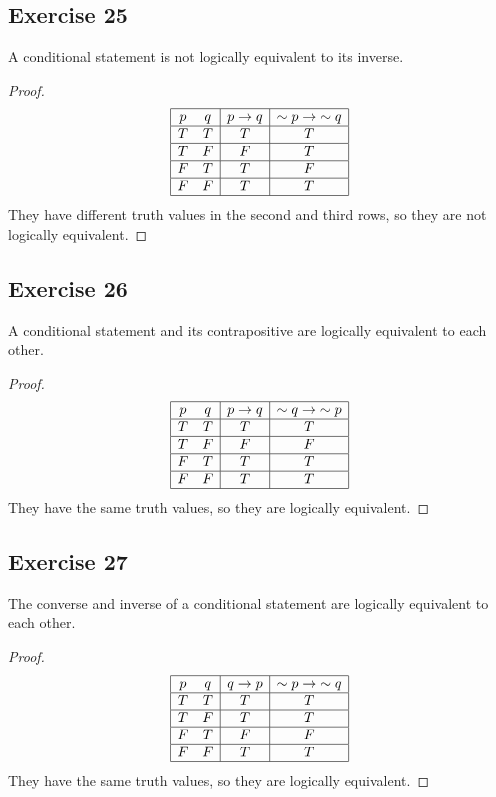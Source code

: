 \documentclass[14pt]{extarticle}
\begin{document}
\subsection{Exercise 25} A conditional statement is not logically equivalent to its inverse.

\begin{proof}
$$
\begin{array}{|cc|c|c|}
\hline
p & q & p \to q & {\sim p} \to {\sim q} \\
\hline
T & T & T & T \\
\hline
T & F & F & T \\
\hline
F & T & T & F \\
\hline
F & F & T & T \\
\hline
\end{array}
$$
They have different truth values in the second and third rows, so they are not logically equivalent.
\end{proof}

\subsection{Exercise 26}
A conditional statement and its contrapositive are logically equivalent to each other.

\begin{proof}
$$
\begin{array}{|cc|c|c|}
\hline
p & q & p \to q & {\sim q} \to{\sim p} \\
\hline
T & T & T & T \\
\hline
T & F & F & F \\
\hline
F & T & T & T \\
\hline
F & F & T & T \\
\hline
\end{array}
$$
They have the same truth values, so they are logically equivalent.
\end{proof}

\subsection{Exercise 27}
The converse and inverse of a conditional statement are logically equivalent to each other.

\begin{proof}
$$
\begin{array}{|cc|c|c|}
\hline
p & q & q \to p & {\sim p} \to {\sim q} \\
\hline
T & T & T & T \\
\hline
T & F & T & T \\
\hline
F & T & F & F \\
\hline
F & F & T & T \\
\hline
\end{array}
$$
They have the same truth values, so they are logically equivalent.
\end{proof}
\end{document}
